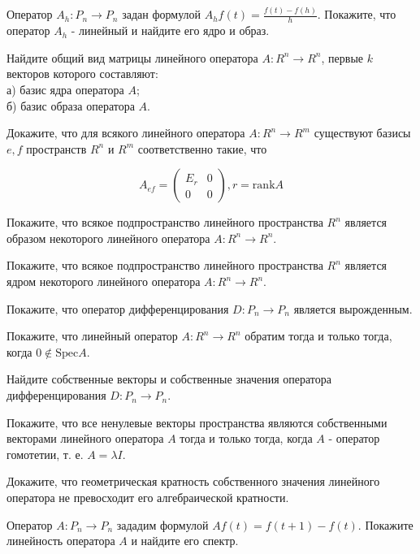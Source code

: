 \begin{list}{.}{}
\item Оператор $A_h:P_n \to P_n$ задан формулой $A_h f(t)=\frac{f(t)-f(h)}{h}$. Покажите, что оператор $A_h$ - линейный и найдите его ядро и образ.

\item Найдите общий вид матрицы линейного оператора $A:R^n \to R^n$, первые $k$ векторов которого составляют:\\
а) базис ядра оператора $A$;\\
б) базис образа оператора $A$.

\item Докажите, что для всякого линейного оператора $A:R^n \to R^m$ существуют базисы $e,f$ пространств $R^n$ и $R^m$ соответственно такие, что

$$A_{ef}=\left(
\begin{array}{c|c}
E_r & 0 \\
\hline
0 & 0
\end{array}
\right), r=\mathrm{rank}A
$$

\item Покажите, что всякое подпространство линейного пространства $R^n$ является образом некоторого линейного оператора $A:R^n \to R^n$.

\item Покажите, что всякое подпространство линейного пространства $R^n$ является ядром некоторого линейного оператора $A:R^n \to R^n$.

\item Покажите, что оператор дифференцирования $D:P_n \to P_n$ является вырожденным.

\item Покажите, что линейный оператор $A:R^n \to R^n$ обратим тогда и только тогда, когда $0 \notin \mathrm{Spec}A$.

\item Найдите собственные векторы и собственные значения оператора дифференцирования $D:P_n \to P_n$.

\item Покажите, что все ненулевые векторы пространства являются собственными векторами линейного оператора $A$ тогда и только тогда, когда $A$ - оператор гомотетии, т. е. $A=\lambda I$.

\item Докажите, что геометрическая кратность собственного значения линейного оператора не превосходит его алгебраической кратности.

\item Оператор $A:P_n \to P_n$ зададим формулой $Af(t)=f(t+1)-f(t)$. Покажите линейность оператора $A$ и найдите его спектр.


\end{list}
